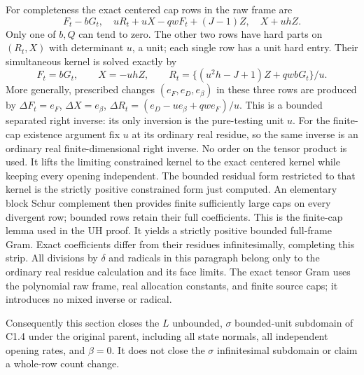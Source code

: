 For completeness the exact centered cap rows in the raw frame are
\[
 F_t-bG_t,\quad
 uR_t+uX-qwF_t+(J-1)Z,\quad X+uhZ.
\]
Only one of $b,Q$ can tend to zero. The other two rows have hard parts
on $(R_t,X)$ with determinant $u$, a unit; each single row has a unit
hard entry. Their simultaneous kernel is solved exactly by
\[
F_t=bG_t,\qquad X=-uhZ,\qquad
R_t=\{(u^2h-J+1)Z+qwbG_t\}/u.
\]
More generally, prescribed changes $(e_F,e_D,e_\beta)$ in these three
rows are produced by
$\Delta F_t=e_F$, $\Delta X=e_\beta$,
$\Delta R_t=(e_D-u e_\beta+qw e_F)/u$.
This is a bounded separated right inverse: its only inversion is the
pure-testing unit $u$. For the finite-cap existence argument fix $u$
at its ordinary real residue, so the same inverse is an ordinary real
finite-dimensional right inverse. No order on the tensor product is
used. It lifts the limiting constrained kernel to the exact centered
kernel while keeping every opening independent. The
bounded residual form restricted to that kernel is the strictly positive
constrained form just computed. An elementary block Schur complement
then provides finite sufficiently large caps on every divergent row;
bounded rows retain their full coefficients. This is the finite-cap
lemma used in the UH proof. It yields a strictly positive bounded
full-frame Gram. Exact coefficients differ from their residues
infinitesimally, completing this strip.
All divisions by $\delta$ and radicals in this paragraph belong only
to the ordinary real residue calculation and its face limits. The exact
tensor Gram uses the polynomial raw frame, real allocation constants,
and finite source caps; it introduces no mixed inverse or radical.

Consequently this section closes the $L$ unbounded, $\sigma$ bounded-unit
subdomain of C1.4 under the original parent, including all state normals,
all independent opening rates, and $\beta=0$. It does not close the
$\sigma$ infinitesimal subdomain or claim a whole-row count change.
